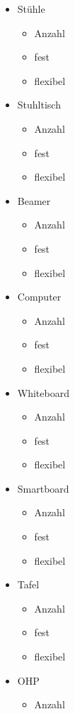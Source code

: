 \begin{itemize}
\begin{itemize}
\begin{itemize}
\begin{itemize}
			\end{itemize}
			\item Stühle
			\begin{itemize}
				\item Anzahl
				\item fest
				\item flexibel
			\end{itemize}
			\item Stuhltisch
			\begin{itemize}
				\item Anzahl
				\item fest
				\item flexibel
			\end{itemize}
			\item Beamer
			\begin{itemize}
				\item Anzahl
				\item fest
				\item flexibel
			\end{itemize}
			\item Computer
			\begin{itemize}
				\item Anzahl
				\item fest
				\item flexibel
			\end{itemize}
			\item Whiteboard
			\begin{itemize}
				\item Anzahl
				\item fest
				\item flexibel
			\end{itemize}
			\item Smartboard
			\begin{itemize}
				\item Anzahl
				\item fest
				\item flexibel
			\end{itemize}
			\item Tafel
			\begin{itemize}
				\item Anzahl
				\item fest
				\item flexibel
			\end{itemize}
			\item OHP
			\begin{itemize}
				\item Anzahl

\end{itemize}
\end{itemize}
\end{itemize}
\end{itemize}

